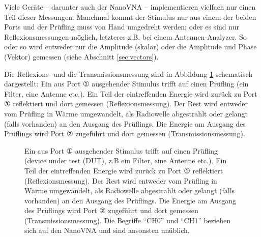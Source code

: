 \documentclass[twoside,a4paper,11pt,halfparskip,DIV=11,notitlepage]{scrartcl}
\begin{document}
Viele Geräte -- darunter auch der NanoVNA -- implementieren vielfach nur einen Teil
dieser Messungen. Manchmal kommt der Stimulus nur aus einem der beiden Ports
und der Prüfling muss von Hand umgedreht werden; oder es sind nur
Reflexionsmessungen möglich, letzteres z.B. bei einem Antennen-Analyzer. So
oder so wird entweder nur die Amplitude (skalar) oder die Amplitude und Phase
(Vektor) gemessen (siehe Abschnitt \ref{sec:vectors}).

Die Reflexions- und die Transmissionsmessung sind in
Abbildung \ref{fig:testset} schematisch dargestellt: Ein aus Port ① ausgehender
Stimulus trifft auf einen Prüfling (ein Filter, eine Antenne etc.). Ein Teil
der eintreffenden Energie wird zurück zu Port ① reflektiert und dort gemessen
(Reflexionsmessung). Der Rest wird entweder vom Prüfling in Wärme umgewandelt,
als Radiowelle abgestrahlt oder gelangt (falls vorhanden) an den Ausgang des
Prüflings. Die Energie am Ausgang des Prüflings wird Port ② zugeführt
und dort gemessen (Transmissionsmessung).

\begin{figure}[H]
    \begin{center}
    \end{center}
    \caption{Ein aus Port ① ausgehender Stimulus trifft auf einen Prüfling (device under test (DUT), z.B
        ein Filter, eine Antenne etc.). Ein Teil der eintreffenden Energie wird zurück zu Port ① reflektiert
        (Reflexionsmessung). Der Rest wird entweder vom Prüfling in Wärme umgewandelt, als Radiowelle
        abgestrahlt oder gelangt (falls vorhanden) an den Ausgang des Prüflings. Die Energie am Ausgang
        des Prüflings wird Port ② zugeführt und dort gemessen (Transmissionsmessung). Die Begriffe ``CH0''
        und ``CH1'' beziehen sich auf den NanoVNA und sind ansonsten unüblich.}
    \label{fig:testset}
\end{figure}
\end{document}
